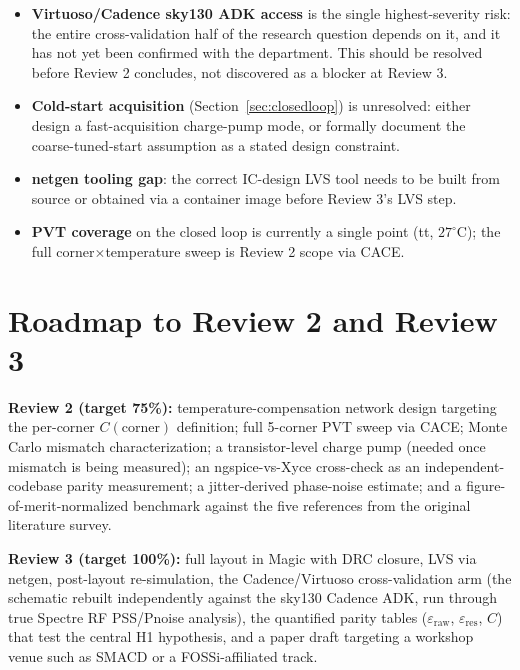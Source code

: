 \documentclass[11pt]{article}
\begin{document}
\begin{itemize}[leftmargin=1.5em]
  \item \textbf{Virtuoso/Cadence sky130 ADK access} is the single highest-severity risk: the entire cross-validation half of the research question depends on it, and it has not yet been confirmed with the department. This should be resolved before Review 2 concludes, not discovered as a blocker at Review 3.
  \item \textbf{Cold-start acquisition} (Section~\ref{sec:closedloop}) is unresolved: either design a fast-acquisition charge-pump mode, or formally document the coarse-tuned-start assumption as a stated design constraint.
  \item \textbf{netgen tooling gap}: the correct IC-design LVS tool needs to be built from source or obtained via a container image before Review 3's LVS step.
  \item \textbf{PVT coverage} on the closed loop is currently a single point (tt, $27^\circ$C); the full corner$\times$temperature sweep is Review 2 scope via CACE.
\end{itemize}

\section{Roadmap to Review 2 and Review 3}

\textbf{Review 2 (target 75\%):} temperature-compensation network design targeting the per-corner $C(\text{corner})$ definition; full 5-corner PVT sweep via CACE; Monte Carlo mismatch characterization; a transistor-level charge pump (needed once mismatch is being measured); an ngspice-vs-Xyce cross-check as an independent-codebase parity measurement; a jitter-derived phase-noise estimate; and a figure-of-merit-normalized benchmark against the five references from the original literature survey.

\textbf{Review 3 (target 100\%):} full layout in Magic with DRC closure, LVS via netgen, post-layout re-simulation, the Cadence/Virtuoso cross-validation arm (the schematic rebuilt independently against the sky130 Cadence ADK, run through true Spectre RF PSS/Pnoise analysis), the quantified parity tables ($\varepsilon_{\text{raw}}$, $\varepsilon_{\text{res}}$, $C$) that test the central H1 hypothesis, and a paper draft targeting a workshop venue such as SMACD or a FOSSi-affiliated track.

\end{document}

